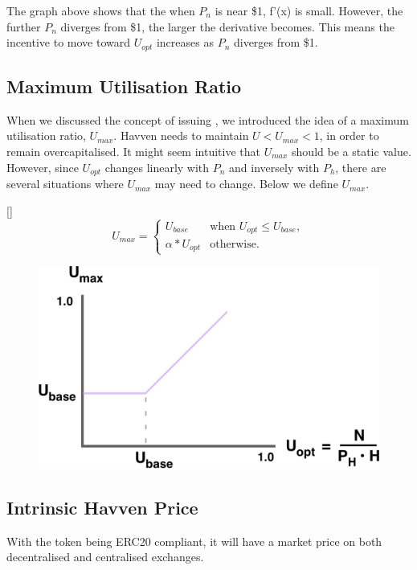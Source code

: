 \noindent The graph above shows that the when $P_n$ is near \$1, f'(x) is small. However, the further $P_n$ diverges from \$1, the larger the derivative becomes. This means the incentive to move toward $U_{opt}$ increases as $P_n$ diverges from \$1.

\newpage

\subsection*{Maximum Utilisation Ratio}

\noindent When we discussed the concept of issuing \NOM{}, we introduced the idea of a maximum utilisation ratio, $U_{max}$. Havven needs to maintain $U < U_{max} < 1$, in order to remain overcapitalised. It might seem intuitive that $U_{max}$ should be a static value. However, since $U_{opt}$ changes linearly with $P_n$ and inversely with $P_h$, there are several situations where $U_{max}$ may need to change. Below we define $U_{max}$.

\begin{namedthm}{}[]
\[
U_{max} = 
\begin{cases}
 U_{base} &\mbox{when } U_{opt} \leq U_{base}, \\ 
 \alpha * U_{opt} &\mbox{otherwise}.
 \end{cases}
\]
\end{namedthm}

\begin{figure}[h!]
    \centering
    \includegraphics[width=.75\textwidth]{img/U_max}
\end{figure}

\newpage

\subsection{Intrinsic Havven Price} With the \HAV{} token being ERC20 compliant, it will have a market price on both decentralised and centralised exchanges. \\

